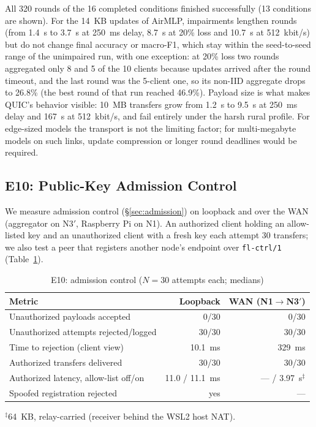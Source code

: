 \documentclass[a4paper,fleqn]{cas-dc}
\begin{document}
All 320 rounds of the 16 completed conditions finished successfully (13 conditions are shown). For the 14~KB updates of AirMLP, impairments lengthen rounds (from 1.4~s to 3.7~s at 250~ms delay, 8.7~s at 20\% loss and 10.7~s at 512~kbit/s) but do not change final accuracy or macro-F1, which stay within the seed-to-seed range of the unimpaired run, with one exception: at 20\% loss two rounds aggregated only 8 and 5 of the 10 clients because updates arrived after the round timeout, and the last round was the 5-client one, so its non-IID aggregate drops to 26.8\% (the best round of that run reached 46.9\%). Payload size is what makes QUIC's behavior visible: 10~MB transfers grow from 1.2~s to 9.5~s at 250~ms delay and 167~s at 512~kbit/s, and fail entirely under the harsh rural profile. For edge-sized models the transport is not the limiting factor; for multi-megabyte models on such links, update compression or longer round deadlines would be required.

\subsection{E10: Public-Key Admission Control}
\label{sec:e10}

We measure admission control (\S\ref{sec:admission}) on loopback and over the WAN (aggregator on N3$'$, Raspberry Pi on N1). An authorized client holding an allow-listed key and an unauthorized client with a fresh key each attempt 30 transfers; we also test a peer that registers another node's endpoint over \texttt{fl-ctrl/1} (Table~\ref{tab:e10}).

\begin{table}[t]
\centering
\caption{E10: admission control ($N{=}30$ attempts each; medians)}
\label{tab:e10}
\scriptsize
\setlength{\tabcolsep}{3pt}
\begin{tabular}{@{}l r r@{}}
\toprule
\textbf{Metric} & \textbf{Loopback} & \textbf{WAN (N1$\to$N3$'$)} \\
\midrule
Unauthorized payloads accepted        & 0/30     & 0/30 \\
Unauthorized attempts rejected/logged & 30/30    & 30/30 \\
Time to rejection (client view)       & 10.1~ms  & 329~ms \\
Authorized transfers delivered        & 30/30    & 30/30 \\
Authorized latency, allow-list off/on & 11.0 / 11.1~ms & --- / 3.97~s$^{\ddagger}$ \\
Spoofed registration rejected         & yes      & --- \\
\bottomrule
\end{tabular}
\vspace{0.3em}

{\scriptsize $^{\ddagger}$64~KB, relay-carried (receiver behind the WSL2 host NAT).}
\end{table}
\end{document}
